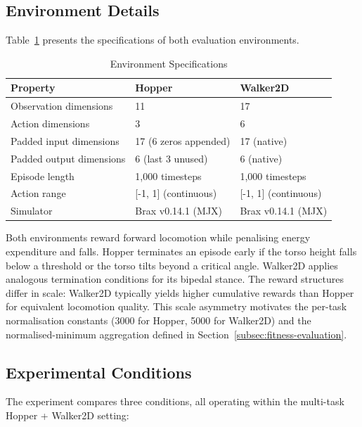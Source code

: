 \documentclass[12pt]{article}
\begin{document}
\subsection{Environment Details}
\label{subsec:environment-details}

Table~\ref{tab:env-specs} presents the specifications of both evaluation environments.

\begin{table}[h]
\centering
\caption{Environment Specifications}
\label{tab:env-specs}
\begin{tabular}{lll}
\toprule
\textbf{Property} & \textbf{Hopper} & \textbf{Walker2D} \\
\midrule
Observation dimensions & 11 & 17 \\
Action dimensions & 3 & 6 \\
Padded input dimensions & 17 (6 zeros appended) & 17 (native) \\
Padded output dimensions & 6 (last 3 unused) & 6 (native) \\
Episode length & 1,000 timesteps & 1,000 timesteps \\
Action range & [-1, 1] (continuous) & [-1, 1] (continuous) \\
Simulator & Brax v0.14.1 (MJX) & Brax v0.14.1 (MJX) \\
\bottomrule
\end{tabular}
\end{table}

Both environments reward forward locomotion while penalising energy expenditure and falls.
Hopper terminates an episode early if the torso height falls below a threshold or the torso tilts beyond a critical angle. Walker2D applies analogous termination conditions for its bipedal stance.
The reward structures differ in scale: Walker2D typically yields higher cumulative rewards than Hopper for equivalent locomotion quality.
This scale asymmetry motivates the per-task normalisation constants (3000 for Hopper, 5000 for Walker2D) and the normalised-minimum aggregation defined in Section~\ref{subsec:fitness-evaluation}.

\subsection{Experimental Conditions}
\label{subsec:experimental-conditions}

The experiment compares three conditions, all operating within the multi-task Hopper + Walker2D setting:
\end{document}
